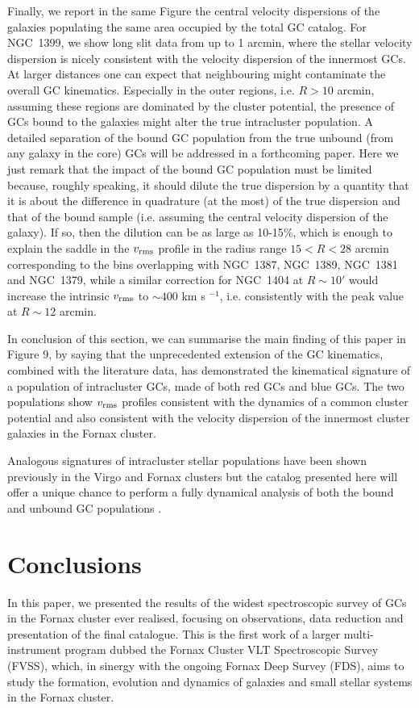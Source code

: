 \documentclass[useAMS,usenatbib]{mn2e}
\begin{document}
Finally, we report in the same Figure the central velocity dispersions of 
the galaxies populating the same area occupied by the total GC catalog. 
For NGC~1399, we show long slit data from \citet{Saglia00} up 
to 1 arcmin, where the stellar velocity dispersion is nicely consistent with
the velocity dispersion of the innermost GCs.
At larger distances one can expect that neighbouring 
might contaminate the overall GC kinematics. Especially in the outer regions, 
i.e. $R>10$ arcmin, assuming these regions are dominated by the cluster 
potential, the presence of GCs bound to the galaxies might alter the true  
intracluster population. A detailed separation of the bound GC population from 
the true unbound (from any galaxy in the core) GCs will be addressed in a 
forthcoming paper. Here we just remark that the impact of the bound GC 
population must be limited because, roughly speaking, it should dilute the true 
dispersion by a quantity that it is about the difference in quadrature (at the 
most) of the true dispersion and that of the bound sample (i.e. assuming the 
central velocity dispersion of the galaxy). If so, then the dilution can be as 
large as 10-15$\%$, which is enough to explain the saddle in the  $v_{\rm rms}$ 
profile in the radius range $15<R<28$ arcmin corresponding to the bins 
overlapping with NGC~1387, NGC~1389, NGC~1381 and NGC~1379, while a similar 
correction for NGC~1404 at $R\sim10'$ would increase the intrinsic $v_{\rm 
rms}$ to $\sim400$ km s $^{-1}$, i.e. consistently with the peak value at 
$R\sim 12$ arcmin.

In conclusion of this section, we can summarise the main finding of this paper 
in Figure 9, by saying that the unprecedented extension of the GC kinematics, 
combined with the literature data, has demonstrated the kinematical signature 
of a population of intracluster GCs, made of both red GCs and blue GCs. The two 
populations show $v_{\rm rms}$ profiles consistent with the dynamics of a 
common cluster potential and also consistent with the velocity dispersion of 
the innermost cluster galaxies in the Fornax cluster. 

Analogous signatures of intracluster stellar populations have been shown 
previously in the Virgo and Fornax clusters \citep[see e.g., ][]{Arnaboldi04, 
Longobardi15, Paolillo02} but the catalog presented here will offer a unique 
chance to perform a fully dynamical analysis of both the bound and unbound GC 
populations \citep{DAbrusco16}.

\section{Conclusions}
\label{sec:conclusions}
In this paper, we presented the results of the widest spectroscopic survey of 
GCs in the Fornax cluster ever realised, focusing on observations, data 
reduction and presentation of the final catalogue. This is the first work of a 
larger multi-instrument program dubbed the Fornax Cluster VLT Spectroscopic 
Survey (FVSS), which, in sinergy with the ongoing Fornax Deep Survey (FDS), 
aims to study the formation, evolution and dynamics of galaxies and small 
stellar systems in the Fornax cluster.
\end{document}
